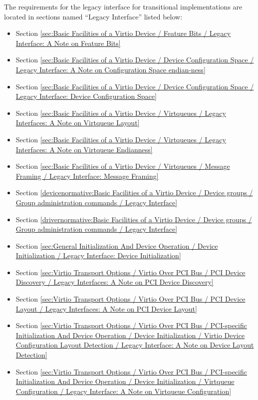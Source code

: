The requirements for the legacy interface for transitional implementations
are located in sections named ``Legacy Interface'' listed below:
\begin{itemize}
\item Section \ref{sec:Basic Facilities of a Virtio Device /
Feature Bits / Legacy Interface: A Note on Feature Bits}
\item Section \ref{sec:Basic Facilities of a Virtio Device / Device Configuration Space / Legacy Interface: A Note on Configuration Space endian-ness}
\item Section \ref{sec:Basic Facilities of a Virtio Device / Device Configuration Space / Legacy Interface: Device Configuration Space}
\item Section \ref{sec:Basic Facilities of a Virtio Device / Virtqueues / Legacy Interfaces: A Note on Virtqueue Layout}
\item Section \ref{sec:Basic Facilities of a Virtio Device / Virtqueues / Legacy Interfaces: A Note on Virtqueue Endianness}
\item Section \ref{sec:Basic Facilities of a Virtio Device / Virtqueues / Message Framing / Legacy Interface: Message Framing}
\item Section \ref{devicenormative:Basic Facilities of a Virtio Device / Device groups / Group administration commands / Legacy Interface}
\item Section \ref{drivernormative:Basic Facilities of a Virtio Device / Device groups / Group administration commands / Legacy Interface}
\item Section \ref{sec:General Initialization And Device Operation / Device Initialization / Legacy Interface: Device Initialization}
\item Section \ref{sec:Virtio Transport Options / Virtio Over PCI Bus / PCI Device Discovery / Legacy Interfaces: A Note on PCI Device Discovery}
\item Section \ref{sec:Virtio Transport Options / Virtio Over PCI Bus / PCI Device Layout / Legacy Interfaces: A Note on PCI Device Layout}
\item Section \ref{sec:Virtio Transport Options / Virtio Over PCI Bus / PCI-specific Initialization And Device Operation / Device Initialization / Virtio Device Configuration Layout Detection / Legacy Interface: A Note on Device Layout Detection}
\item Section \ref{sec:Virtio Transport Options / Virtio Over PCI Bus / PCI-specific Initialization And Device Operation / Device Initialization / Virtqueue Configuration / Legacy Interface: A Note on Virtqueue Configuration}

\end{itemize}
